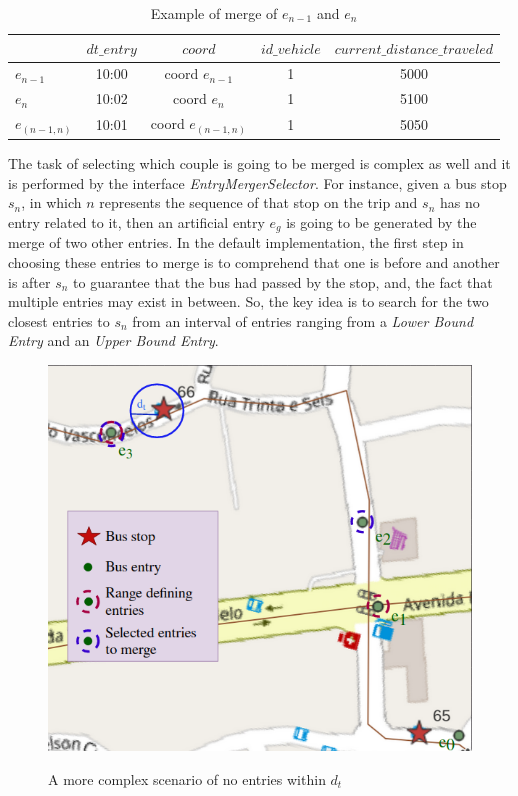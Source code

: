 \begin{table}[h]
\centering
\caption{Example of merge of $e_{n-1}$ and $e_n$ } 
\begin{tabular}{|l|c|c|c|c|}
\hline
\multicolumn{1}{|c|}{} & $dt\_entry$    & $coord$    & \multicolumn{1}{l|}{$id\_vehicle$} & \multicolumn{1}{l|}{$current\_distance\_traveled$} \\ \hline
$e_{n-1}$                & 10:00 &  coord $e_{n-1}$         & 1     &    5000     \\ \hline
$e_n$                & 10:02  & coord $e_{n}$ &               1    & 5100                   \\ \hline
$e_{(n-1, n)}$                & 10:01 & coord $e_{(n-1, n)}$ &    1               & 5050                 \\ \hline
\end{tabular}
\label{tab:merger}
\end{table}


The task of selecting which couple is going to be merged is complex as well and
it is performed by the interface \textit{EntryMergerSelector}.
For instance, given a bus stop $s_n$, in which $n$ represents the sequence of that stop on
the trip and $s_n$ has no entry related to it,
then an artificial entry $e_g$ is going to be generated by the merge of two other entries. 
In the default implementation,
the first step in choosing these entries to merge is to comprehend that one is before and 
another is after $s_n$ to guarantee that the bus had passed by the stop, and,
the fact that multiple entries may exist in between. 
So, the key idea is to search for the two closest entries to $s_n$
from an interval of entries ranging from a {\em Lower Bound Entry} 
and an {\em Upper Bound Entry}.


    \begin{figure}[h]
        \centering
        \caption{A more complex scenario of no entries within $d_t$}
        \includegraphics[scale=0.5]{imagem/cap4/9202_hard.png}
        \label{img:4:4}
    \end{figure}


